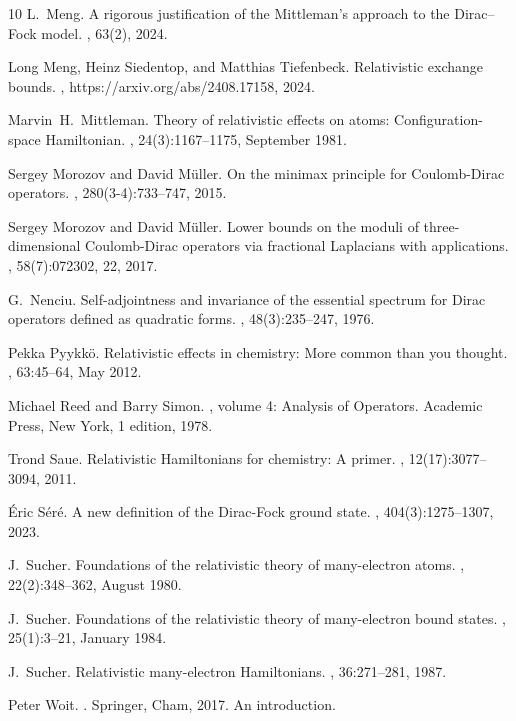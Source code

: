 \documentclass[a4paper]{amsart}
\begin{document}
\begin{thebibliography}{10}
L.~Meng.
\newblock A rigorous justification of the {M}ittleman’s approach to the
  {D}irac–{F}ock model.
, 63(2), 2024.

Long Meng, Heinz Siedentop, and Matthias Tiefenbeck.
\newblock Relativistic exchange bounds.
, https://arxiv.org/abs/2408.17158, 2024.

Marvin~H.\ Mittleman.
\newblock Theory of relativistic effects on atoms: Configuration-space
  {H}amiltonian.
, 24(3):1167--1175, September 1981.

Sergey Morozov and David M\"{u}ller.
\newblock On the minimax principle for {C}oulomb-{D}irac operators.
, 280(3-4):733--747, 2015.

Sergey Morozov and David M\"{u}ller.
\newblock Lower bounds on the moduli of three-dimensional {C}oulomb-{D}irac
  operators via fractional {L}aplacians with applications.
, 58(7):072302, 22, 2017.

G.~Nenciu.
\newblock Self-adjointness and invariance of the essential spectrum for {D}irac
  operators defined as quadratic forms.
, 48(3):235--247, 1976.

Pekka Pyykkö.
\newblock Relativistic effects in chemistry: More common than you thought.
, 63:45--64, May 2012.

Michael Reed and Barry Simon.
, volume 4: Analysis of
  Operators.
\newblock Academic Press, New York, 1 edition, 1978.

Trond Saue.
\newblock Relativistic {H}amiltonians for chemistry: A primer.
, 12(17):3077--3094, 2011.

\'{E}ric S\'{e}r\'{e}.
\newblock A new definition of the {D}irac-{F}ock ground state.
, 404(3):1275--1307, 2023.

J.\ Sucher.
\newblock Foundations of the relativistic theory of many-electron atoms.
, 22(2):348--362, August 1980.

J.~Sucher.
\newblock Foundations of the relativistic theory of many-electron bound states.
, 25(1):3--21,
  January 1984.

J.\ Sucher.
\newblock Relativistic many-electron {H}amiltonians.
, 36:271--281, 1987.

Peter Woit.
.
\newblock Springer, Cham, 2017.
\newblock An introduction.

\end{thebibliography}
\end{document}
